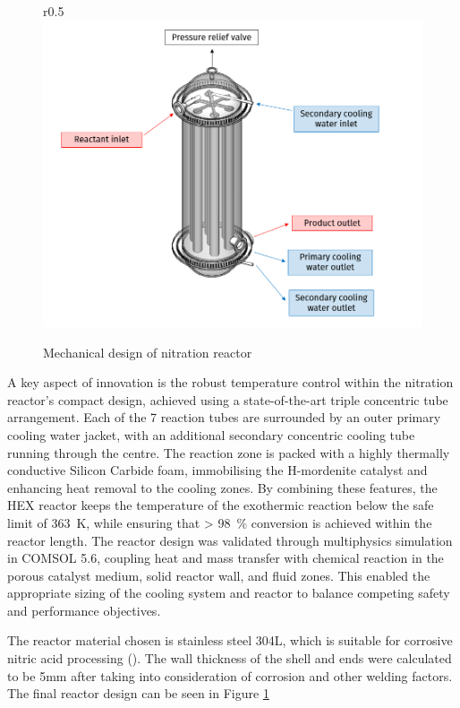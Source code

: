 \begin{figure}{r}{0.5\linewidth}
    \centering
    \includegraphics[width=\linewidth]{figures/FYD executive sum.PNG}
    \caption{Mechanical design of nitration reactor}
    \label{fig:executivesummaryreactor}
\end{figure}
A key aspect of innovation is the robust temperature control within the nitration reactor's compact design, achieved using a state-of-the-art triple concentric tube arrangement. Each of the 7 reaction tubes are surrounded by an outer primary cooling water jacket, with an additional secondary concentric cooling tube running through the centre. The reaction zone is packed with a highly thermally conductive Silicon Carbide foam, immobilising the H-mordenite catalyst and enhancing heat removal to the cooling zones. By combining these features, the HEX reactor keeps the temperature of the exothermic reaction below the safe limit of \SI{363}{\K}, while ensuring that \SI{> 98}{\percent} conversion is achieved within the reactor length. The reactor design was validated through multiphysics simulation in COMSOL 5.6, coupling heat and mass transfer with chemical reaction in the porous catalyst medium, solid reactor wall, and fluid zones. This enabled the appropriate sizing of the cooling system and reactor to balance competing safety and performance objectives.

The reactor material chosen is stainless steel 304L, which is suitable for corrosive nitric acid processing (). The wall thickness of the shell and ends were calculated to be 5mm after taking into consideration of corrosion and other welding factors. The final reactor design can be seen in Figure \ref{fig:executivesummaryreactor}

